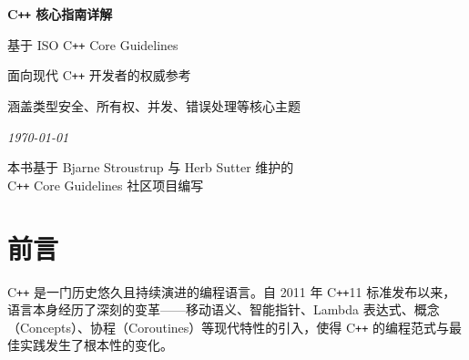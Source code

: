 \documentclass[12pt,a4paper,fontset=fandol]{ctexbook}
\begin{document}
\begin{titlepage}
\centering

\vspace*{3cm}

{\Huge\bfseries\color{blue!60!black} C\texttt{++} 核心指南详解\par}

\vspace{1.2cm}

{\LARGE\color{blue!40!black} 基于 ISO C\texttt{++} Core Guidelines\par}

\vspace{2cm}

\noindent\makebox[\textwidth]{\color{blue!60!black}\rule{0.6\textwidth}{1.2pt}}

\vspace{2cm}

{\large 面向现代 C\texttt{++} 开发者的权威参考\par}

\vspace{0.6cm}

{\large 涵盖类型安全、所有权、并发、错误处理等核心主题\par}

\vspace{3cm}

{\large\itshape \today\par}

\vfill

{\small\color{gray} 本书基于 Bjarne Stroustrup 与 Herb Sutter 维护的\\
C\texttt{++} Core Guidelines 社区项目编写\par}

\end{titlepage}

\frontmatter

\chapter{前言}

C\texttt{++} 是一门历史悠久且持续演进的编程语言。自 2011 年 C\texttt{++}11 标准发布以来，语言本身经历了深刻的变革——移动语义、智能指针、Lambda 表达式、概念（Concepts）、协程（Coroutines）等现代特性的引入，使得 C\texttt{++} 的编程范式与最佳实践发生了根本性的变化。
\end{document}
